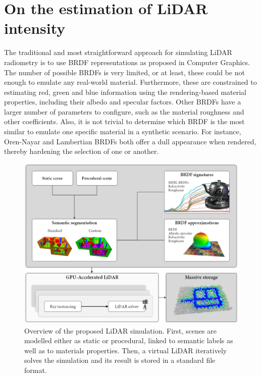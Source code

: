 \section{On the estimation of LiDAR intensity}

The traditional and most straightforward approach for simulating LiDAR radiometry is to use BRDF representations as proposed in Computer Graphics. The number of possible BRDFs is very limited, or at least, these could be not enough to emulate any real-world material. Furthermore, these are constrained to estimating red, green and blue information using the rendering-based material properties, including their albedo and specular factors. Other BRDFs have a larger number of parameters to configure, such as the material roughness and other coefficients. Also, it is not trivial to determine which BRDF is the most similar to emulate one specific material in a synthetic scenario. For instance, Oren-Nayar and Lambertian BRDFs both offer a dull appearance when rendered, thereby hardening the selection of one or another.

\begin{figure}
    \centering
    \includegraphics[width=\linewidth]{figs/lidar_intensity/overview.png}
    \caption{Overview of the proposed LiDAR simulation. First, scenes are modelled either as static or procedural, linked to semantic labels as well as to materials properties. Then, a virtual LiDAR iteratively solves the simulation and its result is stored in a standard file format.}
	\label{fig:lidar_intensity_overview}
\end{figure}

